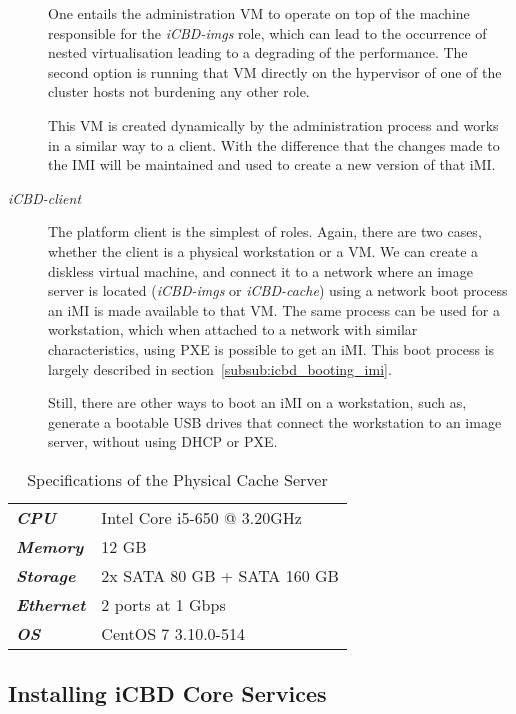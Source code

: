 \begin{description}
	One entails the administration VM to operate on top of the machine responsible for the \textit{iCBD-imgs} role, which can lead to the occurrence of nested virtualisation leading to a degrading of the performance. The second option is running that VM directly on the hypervisor of one of the cluster hosts not burdening any other role. 

	This VM is created dynamically by the administration process and works in a similar way to a client. With the difference that the changes made to the IMI will be maintained and used to create a new version of that iMI.
	\item [\textit{iCBD-client}] The platform client is the simplest of roles. Again, there are two cases, whether the client is a physical workstation or a VM. We can create a diskless virtual machine, and connect it to a network where an image server is located (\textit{iCBD-imgs} or \textit{iCBD-cache}) using a network boot process an iMI is made available to that VM. The same process can be used for a workstation, which when attached to a network with similar characteristics, using PXE is possible to get an iMI. This boot process is largely described in section~\ref{subsub:icbd_booting_imi}. 
	
	Still, there are other ways to boot an iMI on a workstation, such as, generate a bootable USB drives that connect the workstation to an image server, without using DHCP or PXE.
\end{description}

\begin{table}[htpb]
\centering
\begin{tabular}{ll}
\textit{\textbf{CPU}} 		& Intel Core i5-650 @ 3.20GHz \\
\textit{\textbf{Memory}} 	& 12 GB \\
\textit{\textbf{Storage}} 	& 2x SATA 80 GB  + SATA 160 GB \\
\textit{\textbf{Ethernet}} 	& 2 ports at 1 Gbps \\
\textit{\textbf{OS}} 		& CentOS 7 3.10.0-514
\end{tabular}
\caption{Specifications of the Physical Cache Server}
\label{tab:imple_cs}
\end{table}



\subsection{Installing iCBD Core Services}
\label{sub:impl_install_icbd_core}

